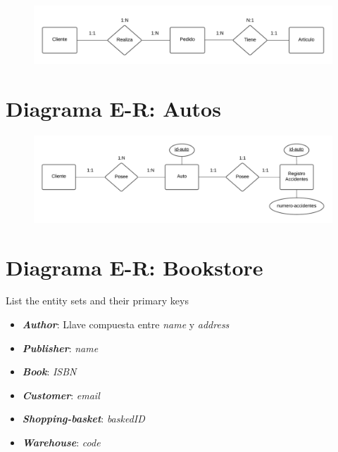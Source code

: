 \documentclass[letterpaper, 12pt]{report}
\newcommand{\bolditalic}[1]{\textbf{\textit{#1}}}
\begin{document}
\begin{figure}[H]
	\begin{center}
		\includegraphics[width=\linewidth]{./Images/Punto_3.png}
	\end{center}
\end{figure}

\section{Diagrama E\@{}-\@{}R:\@{} Autos}

\begin{figure}[H]
	\begin{center}
		\includegraphics[width=\linewidth]{./Images/Punto_4.png}
	\end{center}
\end{figure}

\section{Diagrama E\@{}-\@{}R:\@{} Bookstore}

List the entity sets and their primary keys

\begin{itemize}[label=$\triangleright$]
	\item \bolditalic{Author}: Llave compuesta entre \textit{name} y \textit{address}
	\item \bolditalic{Publisher}: \textit{name}
	\item \bolditalic{Book}: \textit{ISBN}
	\item \bolditalic{Customer}: \textit{email}
	\item \bolditalic{Shopping-basket}: \textit{baskedID}
	\item \bolditalic{Warehouse}: \textit{code}
\end{itemize}
\end{document}
